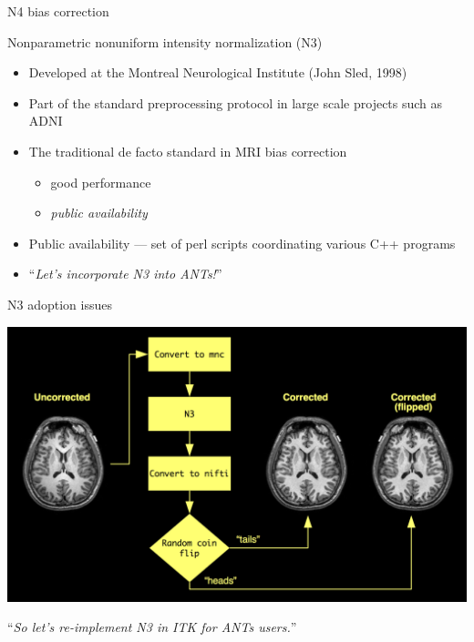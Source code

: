 \documentclass[ignorenonframetext,]{beamer}
\begin{document}
\begin{frame}{N4 bias correction}

\end{frame}

\begin{frame}{Nonparametric nonuniform intensity normalization (N3)}

\begin{itemize}
\item
  Developed at the Montreal Neurological Institute (John Sled, 1998)
\item
  Part of the standard preprocessing protocol in large scale projects
  such as ADNI
\item
  The traditional de facto standard in MRI bias correction

  \begin{itemize}
  \itemsep1pt\parskip0pt
  \item
    good performance
  \item
    \emph{public availability}
  \end{itemize}
\item
  Public availability --- set of perl scripts coordinating various C++
  programs
\item
  ``\emph{Let's incorporate N3 into ANTs!}''
\end{itemize}

\end{frame}

\begin{frame}{N3 adoption issues}

\includegraphics{./Figs/whyN4.png}

``\emph{So let's re-implement N3 in ITK for ANTs users.}''

\end{frame}
\end{document}
